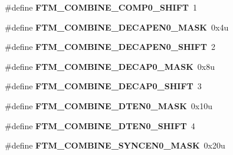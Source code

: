 \begin{DoxyCompactItemize}
\item 
\#define {\bfseries F\+T\+M\+\_\+\+C\+O\+M\+B\+I\+N\+E\+\_\+\+C\+O\+M\+P0\+\_\+\+S\+H\+I\+FT}~1\hypertarget{group__FTM__Register__Masks_ga26f836ae03a05f06608cefafb90082da}{}\label{group__FTM__Register__Masks_ga26f836ae03a05f06608cefafb90082da}

\item 
\#define {\bfseries F\+T\+M\+\_\+\+C\+O\+M\+B\+I\+N\+E\+\_\+\+D\+E\+C\+A\+P\+E\+N0\+\_\+\+M\+A\+SK}~0x4u\hypertarget{group__FTM__Register__Masks_ga77c4a4aae8406f791ebfbc82ba85b584}{}\label{group__FTM__Register__Masks_ga77c4a4aae8406f791ebfbc82ba85b584}

\item 
\#define {\bfseries F\+T\+M\+\_\+\+C\+O\+M\+B\+I\+N\+E\+\_\+\+D\+E\+C\+A\+P\+E\+N0\+\_\+\+S\+H\+I\+FT}~2\hypertarget{group__FTM__Register__Masks_ga5e5b2330d62feae3345f42df20e7f169}{}\label{group__FTM__Register__Masks_ga5e5b2330d62feae3345f42df20e7f169}

\item 
\#define {\bfseries F\+T\+M\+\_\+\+C\+O\+M\+B\+I\+N\+E\+\_\+\+D\+E\+C\+A\+P0\+\_\+\+M\+A\+SK}~0x8u\hypertarget{group__FTM__Register__Masks_ga9d79e8bd8bf1855adbe370ae1499d48d}{}\label{group__FTM__Register__Masks_ga9d79e8bd8bf1855adbe370ae1499d48d}

\item 
\#define {\bfseries F\+T\+M\+\_\+\+C\+O\+M\+B\+I\+N\+E\+\_\+\+D\+E\+C\+A\+P0\+\_\+\+S\+H\+I\+FT}~3\hypertarget{group__FTM__Register__Masks_ga4bfcf4d8cf838ad852c50cf589fd3d95}{}\label{group__FTM__Register__Masks_ga4bfcf4d8cf838ad852c50cf589fd3d95}

\item 
\#define {\bfseries F\+T\+M\+\_\+\+C\+O\+M\+B\+I\+N\+E\+\_\+\+D\+T\+E\+N0\+\_\+\+M\+A\+SK}~0x10u\hypertarget{group__FTM__Register__Masks_ga9722d2bdaba256dd90324aa6b199ee4f}{}\label{group__FTM__Register__Masks_ga9722d2bdaba256dd90324aa6b199ee4f}

\item 
\#define {\bfseries F\+T\+M\+\_\+\+C\+O\+M\+B\+I\+N\+E\+\_\+\+D\+T\+E\+N0\+\_\+\+S\+H\+I\+FT}~4\hypertarget{group__FTM__Register__Masks_gaab1a185d98eb899fea411daf0386858a}{}\label{group__FTM__Register__Masks_gaab1a185d98eb899fea411daf0386858a}

\item 
\#define {\bfseries F\+T\+M\+\_\+\+C\+O\+M\+B\+I\+N\+E\+\_\+\+S\+Y\+N\+C\+E\+N0\+\_\+\+M\+A\+SK}~0x20u\hypertarget{group__FTM__Register__Masks_gafd208921dc5f1d7dde730c67776bce8a}{}\label{group__FTM__Register__Masks_gafd208921dc5f1d7dde730c67776bce8a}


\end{DoxyCompactItemize}
